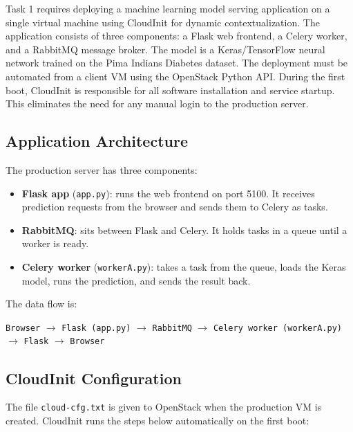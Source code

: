 \documentclass[11pt,a4paper]{article}
\begin{document}
Task 1 requires deploying a machine learning model serving application on a single
virtual machine using CloudInit for dynamic contextualization. The application
consists of three components: a Flask web frontend, a Celery worker, and a RabbitMQ
message broker. The model is a Keras/TensorFlow neural network trained on the Pima
Indians Diabetes dataset. The deployment must be automated from a client VM using the OpenStack Python API.
During the first boot, CloudInit is responsible for all software installation and
service startup. This eliminates the need for any manual login to the production server.

\subsection{Application Architecture}

The production server has three components:

\begin{itemize}[leftmargin=1.5cm]
  \item \textbf{Flask app} (\texttt{app.py}): runs the web frontend on port 5100.
        It receives prediction requests from the browser and sends them to Celery
        as tasks.
  \item \textbf{RabbitMQ}: sits between Flask and Celery. It holds tasks in a queue
        until a worker is ready.
  \item \textbf{Celery worker} (\texttt{workerA.py}): takes a task from the queue,
        loads the Keras model, runs the prediction, and sends the result back.
\end{itemize}

The data flow is:
\begin{center}
  \texttt{Browser} $\rightarrow$ \texttt{Flask (app.py)} $\rightarrow$
  \texttt{RabbitMQ} $\rightarrow$ \texttt{Celery worker (workerA.py)}
  $\rightarrow$ \texttt{Flask} $\rightarrow$ \texttt{Browser}
\end{center}

\subsection{CloudInit Configuration}

The file \texttt{cloud-cfg.txt} is given to OpenStack when the production VM is
created. CloudInit runs the steps below automatically on the first boot:
\end{document}
